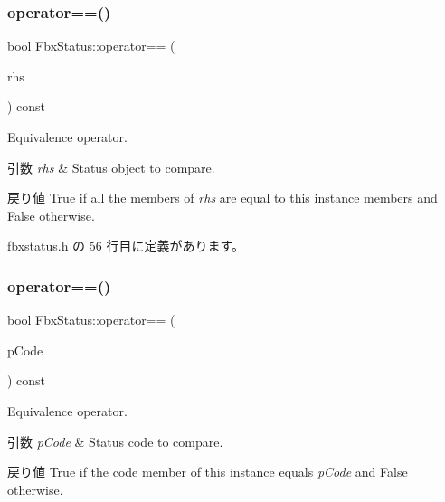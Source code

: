 \mbox{\label{class_fbx_status_a7dfb7606bdb3fb0df2cceb9edc01c4df}} 
\subsubsection{\texorpdfstring{operator==()}{operator==()}\hspace{0.1cm}{\footnotesize\ttfamily [1/2]}}
{\footnotesize\ttfamily bool Fbx\+Status\+::operator== (\begin{DoxyParamCaption}\item[{const \hyperlink{class_fbx_status}{Fbx\+Status} \&}]{rhs }\end{DoxyParamCaption}) const\hspace{0.3cm}{\ttfamily [inline]}}

Equivalence operator. 
\begin{DoxyParams}{引数}
{\em rhs} & Status object to compare. \\
\hline
\end{DoxyParams}
\begin{DoxyReturn}{戻り値}
{\ttfamily True} if all the members of {\itshape rhs} are equal to this instance members and {\ttfamily False} otherwise. 
\end{DoxyReturn}


 fbxstatus.\+h の 56 行目に定義があります。

\mbox{\label{class_fbx_status_aaee475035201b4873ce60261e8a92072}} 
\subsubsection{\texorpdfstring{operator==()}{operator==()}\hspace{0.1cm}{\footnotesize\ttfamily [2/2]}}
{\footnotesize\ttfamily bool Fbx\+Status\+::operator== (\begin{DoxyParamCaption}\item[{const \hyperlink{class_fbx_status_a6a631d5d95b28e31a19aabd5f5809ecc}{E\+Status\+Code}}]{p\+Code }\end{DoxyParamCaption}) const\hspace{0.3cm}{\ttfamily [inline]}}

Equivalence operator. 
\begin{DoxyParams}{引数}
{\em p\+Code} & Status code to compare. \\
\hline
\end{DoxyParams}
\begin{DoxyReturn}{戻り値}
{\ttfamily True} if the code member of this instance equals {\itshape p\+Code} and {\ttfamily False} otherwise. 
\end{DoxyReturn}


